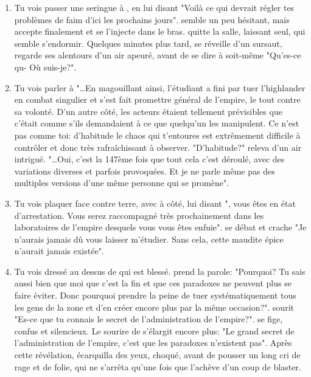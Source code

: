 {\begin{enumerate}
		\item Tu vois \nmPlayerI passer une seringue à \nmPlayerIII, en lui disant "Voilà ce qui devrait régler tes problèmes de faim d'ici les prochains jours". \nmPlayerIII semble un peu hésitant, mais accepte finalement et se l'injecte dans le bras. \nmPlayerI quitte la salle, laissant \nmPlayerIII seul, qui semble s'endormir. Quelques minutes plus tard, \nmPlayerIII se réveille d'un sursaut, regarde ses alentours d'un air apeuré, avant de se dire à soit-même "Qu'es-ce qu- Où suis-je?".
		
		\item Tu vois \nmPlayerIV parler à \nmPlayerXI "\dots En magouillant ainsi, l'étudiant a fini par tuer l'highlander en combat singulier et s'est fait promettre général de l'empire, le tout contre sa volonté. D'un autre côté, les acteurs étaient tellement prévisibles que c'était comme s'ils demandaient à ce que quelqu'un les manipulent. Ce n'est pas comme toi: d'habitude le chaos qui t'entoures est extrêmement difficile à contrôler et donc très rafraîchissant à observer. "D'habitude?" releva \nmPlayerXI d'un air intrigué. "\dots Oui, c'est la 147ème fois que tout cela c'est déroulé, avec des variations diverses et parfois provoquées. Et je ne parle même pas des multiples versions d'une même personne qui se promène".
		
		
		\item Tu vois \nmPlayerVII plaquer \nmPlayerIX face contre terre, avec \nmPlayerXII à côté, lui disant "\nmPlayerIX, vous êtes en état d'arrestation. Vous serez raccompagné très prochainement dans les laboratoires de l'empire desquels vous vous êtes enfuie". \nmPlayerIX se débat et crache "Je n'aurais jamais dû vous laisser m'étudier. Sans cela, cette maudite épice n'aurait jamais existée".
		
		\item Tu vois \nmPlayerXII dressé au dessus de \nmPlayerVII qui est blessé. \nmPlayerVII prend la parole: "Pourquoi? Tu sais aussi bien que moi que c'est la fin et que ces paradoxes ne peuvent plus se faire éviter. Donc pourquoi prendre la peine de tuer systématiquement tous les gens de la zone et d'en créer encore plus par la même occasion?". \nmPlayerXII sourit "Es-ce que tu connais le secret de l'administration de l'empire?". \nmPlayerVII se fige, confus et silencieux.	Le sourire de \nmPlayerXII s'élargit encore plus: "Le grand secret de l'administration de l'empire, c'est que les paradoxes n'existent pas". Après cette révélation, \nmPlayerVII écarquilla des yeux, choqué, avant de pousser un long cri de rage et de folie, qui ne s'arrêta qu'une fois que \nmPlayerXII l'achève d'un coup de blaster.
		

\end{enumerate}}

